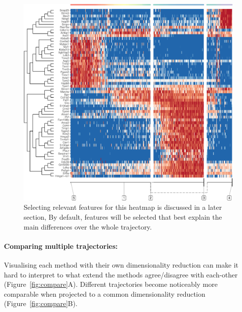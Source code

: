 \begin{figure}[ht!]
	\centering
	\includegraphics[width=.6\linewidth]{manuscript_files/figure-latex/heatmap-1.pdf}
	\caption{Selecting relevant features for this heatmap is discussed in a later
		section, By default, features will be selected that best explain the main differences over the
		whole trajectory.}
	\label{fig:heatmap}
\end{figure}


\paragraph{Comparing multiple trajectories:}
Visualising each method with
their own dimensionality reduction can make it hard to interpret to what
extend the methods agree/disagree with each-other (Figure~\ref{fig:compare}A).
Different trajectories become noticeably more comparable when projected
to a common dimensionality reduction (Figure~\ref{fig:compare}B).

